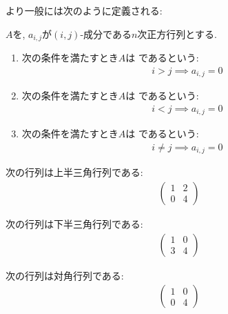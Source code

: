 より一般には次のように定義される:
\begin{definition}
  \label{def:triangular}
  $A$を, $a_{i,j}$が$(i,j)$-成分である$n$次正方行列とする.
  \begin{enumerate}
  \item
    次の条件を満たすとき$A$は
    であるという:
    \begin{align*}
      i>j\implies a_{i,j}=0
    \end{align*}
  \item
    次の条件を満たすとき$A$は
    であるという:
    \begin{align*}
      i<j\implies a_{i,j}=0
    \end{align*}
  \item
    次の条件を満たすとき$A$は
    であるという:
    \begin{align*}
      i\neq j\implies a_{i,j}=0
    \end{align*}
  \end{enumerate}
\end{definition}

\begin{example}
  次の行列は上半三角行列である:
  \begin{align*}
    \begin{pmatrix}
      1&2\\
      0&4
    \end{pmatrix}
  \end{align*}
\end{example}
\begin{example}
  次の行列は下半三角行列である:
  \begin{align*}
    \begin{pmatrix}
      1&0\\
      3&4
    \end{pmatrix}
  \end{align*}
\end{example}
\begin{example}
  次の行列は対角行列である:
  \begin{align*}
    \begin{pmatrix}
      1&0\\
      0&4
    \end{pmatrix}
  \end{align*}
\end{example}

